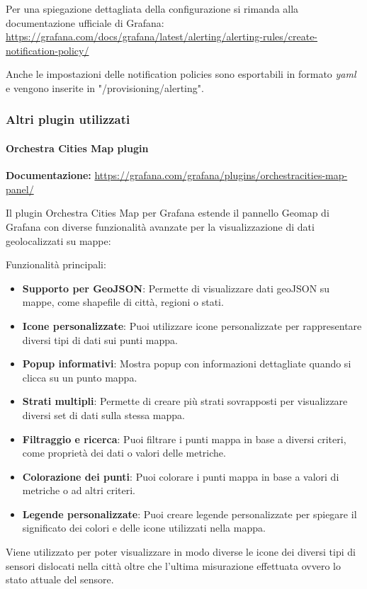 Per una spiegazione dettagliata della configurazione si rimanda alla documentazione ufficiale di Grafana: \href{https://grafana.com/docs/grafana/latest/alerting/alerting-rules/create-notification-policy/}{https://grafana.com/docs/grafana/latest/alerting/alerting-rules/create-notification-policy/}

Anche le impostazioni delle notification policies sono esportabili in formato \textit{yaml} e vengono inserite in "/provisioning/alerting".

\subsubsection{Altri plugin utilizzati}
\paragraph{Orchestra Cities Map plugin}
\textbf{Documentazione:} \href{https://grafana.com/grafana/plugins/orchestracities-map-panel/}{https://grafana.com/grafana/plugins/orchestracities-map-panel/}

Il plugin Orchestra Cities Map per Grafana estende il pannello Geomap di Grafana con diverse funzionalità avanzate per la visualizzazione di dati geolocalizzati su mappe:

Funzionalità principali:
\begin{itemize}
    \item \textbf{Supporto per GeoJSON}: Permette di visualizzare dati geoJSON su mappe, come shapefile di città, regioni o stati.
    \item \textbf{Icone personalizzate}: Puoi utilizzare icone personalizzate per rappresentare diversi tipi di dati sui punti mappa.
    \item \textbf{Popup informativi}: Mostra popup con informazioni dettagliate quando si clicca su un punto mappa.
    \item \textbf{Strati multipli}: Permette di creare più strati sovrapposti per visualizzare diversi set di dati sulla stessa mappa.
    \item \textbf{Filtraggio e ricerca}: Puoi filtrare i punti mappa in base a diversi criteri, come proprietà dei dati o valori delle metriche.
    \item \textbf{Colorazione dei punti}: Puoi colorare i punti mappa in base a valori di metriche o ad altri criteri.
    \item \textbf{Legende personalizzate}: Puoi creare legende personalizzate per spiegare il significato dei colori e delle icone utilizzati nella mappa.
\end{itemize}

Viene utilizzato per poter visualizzare in modo diverse le icone dei diversi tipi di sensori dislocati nella città oltre che l'ultima misurazione effettuata ovvero lo stato attuale del sensore.